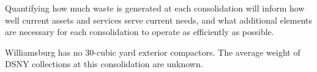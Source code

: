 
    Quantifying how much waste is generated at each consolidation will inform how well current assets and services serve current needs, and what additional elements are necessary for each consolidation to operate as efficiently as possible.
    
    Williamsburg has no 30-cubic yard exterior compactors. The average weight of DSNY collections at this consolidation are unknown.